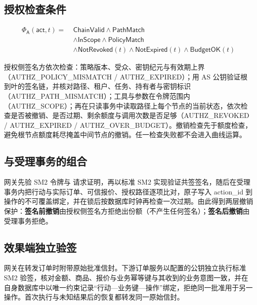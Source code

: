 \documentclass[UTF8,zihao=-4,a4paper]{ctexart}
\newif\ifshowguide
\newcommand{\guide}[1]{%
  \ifshowguide
  \begin{tcolorbox}[colback=gray!8,colframe=gray!45,boxrule=0.4pt,
      arc=1pt,left=4pt,right=4pt,top=2pt,bottom=2pt,fontupper=\small]
  \textbf{写作指引：}#1
  \end{tcolorbox}
  \fi}
\theoremstyle{plain}
\theoremstyle{definition}
\theoremstyle{remark}
\newcommand{\Phiauth}{\Phi_{\mathsf{A}}}
\newcommand{\act}{\mathsf{act}}
\begin{document}
\subsection{授权检查条件}\label{sec:predicate}
\begin{align*}
\Phiauth(\act,t)=\;&\mathsf{ChainValid}\wedge\mathsf{PathMatch}\\
&\wedge\mathsf{InScope}\wedge\mathsf{PolicyMatch}\\
&\wedge\mathsf{NotRevoked}(t)\wedge\mathsf{NotExpired}(t)\wedge\mathsf{BudgetOK}(t)
\end{align*}
\begin{sloppypar}
授权侧签名方依次检查：策略版本、受众、密钥纪元与有效期上界（\allowbreak{}AUTHZ\_POLICY\_MISMATCH /\allowbreak{} AUTHZ\_EXPIRED）；用 AS 公钥验证根到叶的签名链，并核对路径、租户、任务、持有者与密钥标识（\allowbreak{}AUTHZ\_PATH\_MISMATCH）；工具与参数在令牌范围内（\allowbreak{}AUTHZ\_SCOPE）；再在只读事务中读取路径上每个节点的当前状态，依次检查是否被撤销、是否过期、剩余额度与调用次数是否足够（\allowbreak{}AUTHZ\_REVOKED /\allowbreak{} AUTHZ\_EXPIRED /\allowbreak{} AUTHZ\_OVER\_BUDGET）。撤销检查先于额度检查，避免根节点额度耗尽掩盖中间节点的撤销。任一检查失败都不会进入曲线运算。
\end{sloppypar}
\guide{强调两点：（1）授权侧签名方只读、不预留，预算的真正预留仍在网关受理事务中原子完成；（2）授权侧签名方使用仅有 SELECT 权限的数据库角色，写入已被实测拒绝。}

\subsection{与受理事务的组合}\label{sec:compose}
网关先验 SM2 令牌与 请求证明，再以标准 SM2 实现验证共签签名，随后在受理事务内把行动与实际订单、可信报价、授权路径逐项比对，原子写入 action\_id 到操作的不可覆盖绑定，并在锁后按数据库时钟再检查一次过期。由此得到两层撤销保护：\textbf{签名前撤销}由授权侧签名方拒绝出份额（不产生任何签名）；\textbf{签名后撤销}由受理事务拒绝。

\subsection{效果端独立验签}\label{sec:effect}
网关在转发订单时附带原始批准信封。下游订单服务以配置的公钥独立执行标准 SM2 验签，核对金额、商品、报价与业务幂等键与其收到的业务意图一致，并在自身数据库中以唯一约束记录“行动—业务键—操作”绑定，拒绝同一批准用于另一操作。首次执行与未知结果后的恢复都转发同一原始信封。
\guide{写明边界：效果端只复核签名、业务意图与一次性绑定，不查询 AS 的当前撤销与预算、不重做有效期判断；这一点由\cref{sec:freshness}的设计解决。}
\end{document}
